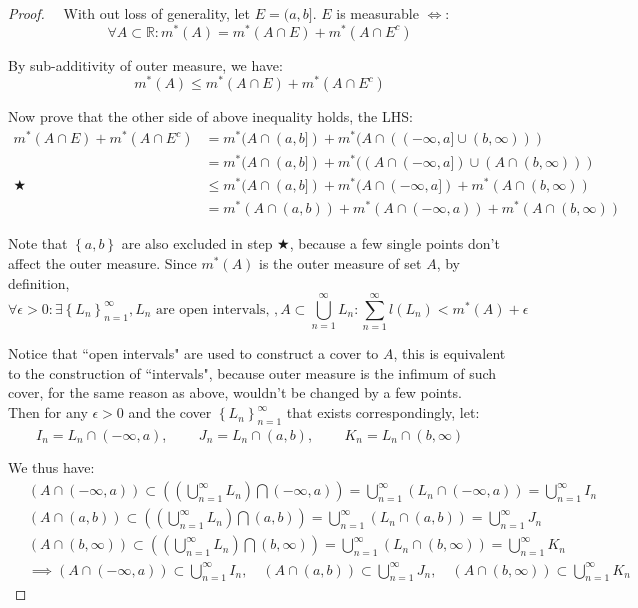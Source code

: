\documentclass[reqno]{amsart}
\theoremstyle{definition}
\begin{document}
\begin{proof}
~\
With out loss of generality, let $E = (a, b]$. $E$ is measurable $\iff$: 
$$
\forall A \subset \mathbb{R}: m^{*}(A) = m^{*}(A \cap E) + m^{*}(A \cap E^{c})
$$

By sub-additivity of outer measure, we have:
$$
m^{*}(A) \leq m^{*}(A \cap E) + m^{*}(A \cap E^{c})
$$

Now prove that the other side of above inequality holds, the LHS:
\begin{align*}
m^{*}(A \cap E) + m^{*}(A \cap E^{c}) & = m^{*}(A \cap (a, b]) + m^{*}(A \cap ((-\infty, a] \cup (b, \infty)))\\
& = m^{*}(A \cap (a, b]) + m^{*}((A \cap (-\infty, a]) \cup (A \cap (b, \infty)))\\
\bigstar & \leq m^{*}(A \cap (a, b]) + m^{*}(A \cap (-\infty, a]) + m^{*}(A \cap (b, \infty))\\
& = m^{*}(A \cap (a, b)) + m^{*}(A \cap (-\infty, a)) + m^{*}(A \cap (b, \infty))
\end{align*}

Note that $\left\{ a, b \right\}$ are also excluded in step $\bigstar$, because a few single points don't affect the outer measure. Since $m^{*}(A)$ is the outer measure of set $A$, by definition,
$$
\forall \epsilon > 0: \exists \left\{ L_{n} \right\}^{\infty}_{n=1}, L_{n} \mbox{ are open intervals, }, A \subset \bigcup\limits^{\infty}_{n=1}L_{n}: \sum\limits^{\infty}_{n=1} l(L_{n}) < m^{*}(A) + \epsilon
$$

Notice that ``open intervals" are used to construct a cover to $A$, this is equivalent to the construction of ``intervals", because outer measure is the infimum of such cover, for the same reason as above, wouldn't be changed by a few points.\\

Then for any $\epsilon > 0$ and the cover $\left\{ L_{n} \right\}^{\infty}_{n=1}$ that exists correspondingly, let:\\

$\qquad I_{n} = L_{n} \cap (-\infty, a)$, $\qquad J_{n} = L_{n} \cap (a, b)$, $\qquad K_{n} = L_{n} \cap (b, \infty)$

We thus have:
\begin{align*}
& (A \cap (-\infty, a)) \subset \left( \left( \bigcup^{\infty}_{n=1}L_{n} \right) \bigcap (-\infty, a) \right) = \bigcup^{\infty}_{n=1}(L_{n} \cap (-\infty, a)) = \bigcup^{\infty}_{n=1}I_{n}\\
& (A \cap (a, b)) \subset \left( \left( \bigcup^{\infty}_{n=1}L_{n} \right) \bigcap (a, b) \right) = \bigcup^{\infty}_{n=1}(L_{n} \cap (a, b)) = \bigcup^{\infty}_{n=1}J_{n}\\\
& (A \cap (b, \infty)) \subset \left( \left( \bigcup^{\infty}_{n=1}L_{n} \right) \bigcap (b, \infty) \right) = \bigcup^{\infty}_{n=1}(L_{n} \cap (b, \infty)) = \bigcup^{\infty}_{n=1}K_{n}\\
& \implies (A \cap (-\infty, a)) \subset \bigcup^{\infty}_{n=1}I_{n}, \quad (A \cap (a, b)) \subset \bigcup^{\infty}_{n=1}J_{n}, \quad (A \cap (b, \infty)) \subset \bigcup^{\infty}_{n=1}K_{n}
\end{align*}


\end{proof}
\end{document}

